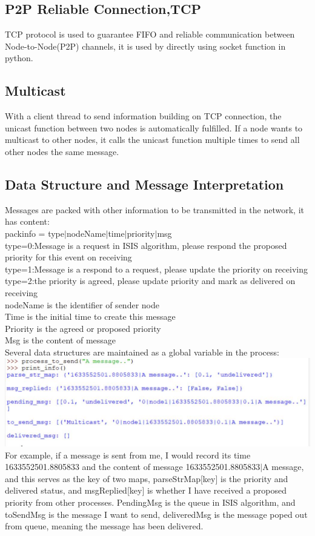 \documentclass{article}
\begin{document}
\subsection{P2P Reliable Connection,TCP}
TCP protocol is used to guarantee FIFO and reliable communication between Node-to-Node(P2P) channels, it is used by directly using socket function in python.
\subsection{Multicast}
With a client thread to send information building on TCP connection, the unicast function between two nodes is automatically fulfilled. If a node wants to multicast to other nodes, it calls the unicast function multiple times to send all other nodes the same message.
\subsection{Data Structure and Message Interpretation}
Messages are packed with other information to be transmitted in the network, it has content:\\
packinfo = type$|$nodeName$|$time$|$priority$|$msg\\
type=0:Message is a request in ISIS algorithm, please respond the proposed priority for this event on receiving\\
type=1:Message is a respond to a request, please update the priority on receiving\\
type=2:the priority is agreed, please update priority and mark as delivered on receiving\\
nodeName is the identifier of sender node\\
Time is the initial time to create this message\\
Priority is the agreed or proposed priority\\
Msg is the content of message\\

Several data structures are maintained as a global variable in the process:\\
\includegraphics[scale=0.7]{msg.jpg}\\
For example, if a message is sent from me, I would record its time 1633552501.8805833 and the content of message 1633552501.8805833$|$A message, and this serves as the key of two maps, parseStrMap[key] is the priority and delivered status, and msgReplied[key] is whether I have received a proposed priority from other processes. PendingMsg is the queue in ISIS algorithm, and toSendMsg is the message I want to send, deliveredMsg is the message poped out from queue, meaning the message has been delivered.
\end{document}
